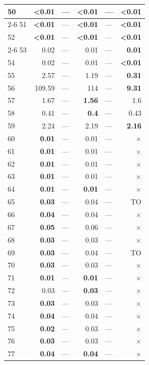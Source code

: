 \begin{longtable}{lr@{\hskip 4pt}l@{\hskip 12pt}r@{\hskip 4pt}l@{\hskip 12pt}r}
50 & \textbf{<0.01} & --- & \textbf{<0.01} & --- & \textbf{<0.01} \\
\cmidrule{2-6}
51 & \textbf{<0.01} & --- & \textbf{<0.01} & --- & \textbf{<0.01} \\
52 & \textbf{<0.01} & --- & \textbf{<0.01} & --- & \textbf{<0.01} \\
\cmidrule{2-6}
53 & 0.02 & --- & 0.01 & --- & \textbf{0.01} \\
54 & 0.02 & --- & 0.01 & --- & \textbf{<0.01} \\
\midrule
55 & 2.57 & --- & 1.19 & --- & \textbf{0.31} \\
56 & 109.59 & --- & 114 & --- & \textbf{9.31} \\
57 & 1.67 & --- & \textbf{1.56} & --- & 1.6 \\
58 & 0.41 & --- & \textbf{0.4} & --- & 0.43 \\
59 & 2.24 & --- & 2.19 & --- & \textbf{2.16} \\
\midrule
60 & \textbf{0.01} & --- & 0.01 & --- & $\times$ \\
61 & \textbf{0.01} & --- & 0.01 & --- & $\times$ \\
62 & \textbf{0.01} & --- & 0.01 & --- & $\times$ \\
63 & \textbf{0.01} & --- & 0.01 & --- & $\times$ \\
64 & \textbf{0.01} & --- & \textbf{0.01} & --- & $\times$ \\
65 & \textbf{0.03} & --- & 0.04 & --- & TO \\
66 & \textbf{0.04} & --- & 0.04 & --- & $\times$ \\
67 & \textbf{0.05} & --- & 0.06 & --- & $\times$ \\
68 & \textbf{0.03} & --- & 0.03 & --- & $\times$ \\
69 & \textbf{0.03} & --- & 0.04 & --- & TO \\
70 & \textbf{0.03} & --- & 0.03 & --- & $\times$ \\
71 & \textbf{0.01} & --- & \textbf{0.01} & --- & $\times$ \\
72 & 0.03 & --- & \textbf{0.03} & --- & $\times$ \\
73 & \textbf{0.03} & --- & 0.03 & --- & $\times$ \\
74 & \textbf{0.04} & --- & 0.04 & --- & $\times$ \\
75 & \textbf{0.02} & --- & 0.03 & --- & $\times$ \\
76 & \textbf{0.03} & --- & 0.03 & --- & $\times$ \\
77 & \textbf{0.04} & --- & \textbf{0.04} & --- & $\times$ \\

\end{longtable}
